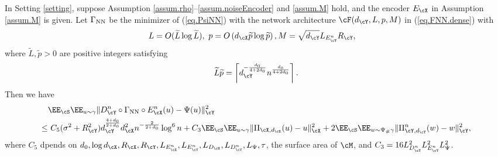 \documentclass[11pt]{article} %
\begin{document}
\begin{theorem}\label{thm.general.M}
	In Setting \ref{setting},
	suppose Assumption \ref{assum.rho}--\ref{assum.noiseEncoder} and \ref{assum.M} hold, and the encoder $E_{\cX}$ in Assumption \ref{assum.M} is given. 
	Let $\Gamma_{\rm NN}$ be the minimizer of (\ref{eq.PsiNN}) with the network architecture $\cF(d_{\cY},L,p,M)$ in (\ref{eq.FNN.dense}) with
	\begin{equation}
		\begin{aligned}
			&L=O(\widetilde{L}\log \widetilde{L}), \ p=O\left(d_{\cX}\widetilde{p} \log \widetilde{p}\right), M=\sqrt{d_{\cY}}L_{E^n_{\cY}}R_{\cY},
		\end{aligned}\label{eq.NN.parameter.n.M.dense}
	\end{equation}
	where $\widetilde{L},\widetilde{p}>0$ are positive integers satisfying 
	\begin{equation}
		\widetilde{L}\widetilde{p}=\left\lceil d_{\cY}^{-\frac{d_0}{4+2d_0}}n^{\frac{d_0}{4+2d_0}}\right\rceil.
		\label{eq.FNN.densecondition.M}
	\end{equation}
	Then we have
	\begin{align}
		&\EE_{\cS}\EE_{u\sim \gamma}\|D_{\cY}^n\circ \Gamma_{\rm NN} \circ E^n_{\cX}(u)- \Psi(u)\|_{\cY}^2 \nonumber\\
		\leq&\ C_{5}(\sigma^2+R_{\cY}^2)d_{\cY}^{\frac{4+d_0}{2+d_0}}d_{\cX}^2n^{-\frac{2}{2+d_0}}\log^6 n   +  C_3\EE_{\cS}\EE_{u\sim \gamma}\| \Pi_{\cX,d_{\cX}}(u)- u\|_{\cX}^2+2\EE_{\cS}\EE_{w\sim \Psi_{\#}\gamma}\|\Pi_{\cY,d_{\cY}}^n(w)- w\|_{\cY}^2,
		\label{eq.error.general.M.dense}
	\end{align}
	where $C_5$ dpends on $d_0,\log d_{\cX}, R_{\cX},  R_{\cY},L_{E^n_{\cX}},L_{E^n_{\cY}},L_{D_{\cX}},L_{D^n_{\cY}},L_{\Psi},\tau$, the surface area of $\cM$, and $C_3=16L_{D^n_{\cY}}^2L_{E^n_{\cY}}^2L_{\Psi}^2$. 
	
	
	
	
	

\end{theorem}
\end{document}
